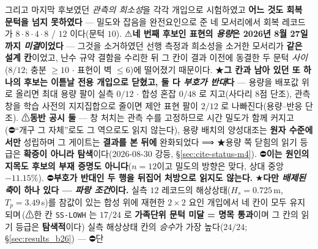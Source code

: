 \documentclass[11pt]{report}
\numberwithin{equation}{chapter}
\numberwithin{figure}{chapter}
\numberwithin{table}{chapter}
\newcommand{\SSLowhNominal}{\,(⚠한 칸 \texttt{SS-LOWH} 는 $17/24$ 로
  \textbf{가족단위 문턱 미달 = 명목 통과}이며 그 칸의 읽기 등급은 \textbf{탐색적}이다)}
\begin{document}
\begin{itemize}
        그리고 마지막 후보였던 \emph{관측의 희소성}을 각각 개입으로 시험하였고
        \textbf{어느 것도 회복 문턱을 넘지 못하였다} --- 밀도와 잡음을 완전요인으로
        준 네 모서리에서 회복 레코드가 $8\cdot8\cdot4\cdot8$ / $12$ 이다(문턱 $10$).
        ⚠\textbf{네 번째 후보인 표현의 \emph{용량}은 2026년 8월 27일까지 \emph{미결}이었다}
        --- 그것을 소거하였던 선행 측정과 희소성을 소거한 모서리가 \textbf{같은 설계 칸}이었고,
        난수 규약 결함을 수리한 뒤 그 칸이 결과 이전에 동결한 두 문턱 \emph{사이}
        ($8/12$; 충분 $\geq 10$ $\cdot$ 표현이 벽 $\leq 6$)에 떨어졌기 때문이다.
        ★\textbf{그 칸과 남아 있던 또 하나의 후보는 이튿날 전용 개입으로 닫혔고, 둘 다
        \emph{부호가 반대}다} --- 용량을 배포값 위로 올리면 최대 용량 팔이 실측 $0/12$
        $\cdot$ 합성 혼잡 $0/48$ 로 지고(사다리 $8$점 단조), 관측 창을 학습 사전의
        지지집합으로 줄이면 제안 표현 팔이 $2/12$ 로 나빠진다(용량--반응 단조).
        ⚠\textbf{동반 공시 둘} --- 창 처치는 관측 수를 고정하므로 시간 밀도가 함께
        커지고(⛔``개구 그 자체''로도 그 역으로도 읽지 않는다), 용량 배치의 양성대조는
        \textbf{원자 수준에서만} 성립하며 그 게이트는 \textbf{결과를 본 뒤에} 완화되었다
        ⟹ ★용량 쪽 닫힘의 읽기 등급은 \textbf{확증이 아니라 탐색}이다(2026-08-30 강등,
        \S\ref{sec:cite-status-m4}).
        ⛔\textbf{이는 원인의 지목도 후보의 부재 증명도 아니다}($n = 12$이고 밀도의
        방향은 맞다, 상대 중앙 $-11.15\%$). ⛔\textbf{부호가 반대인 두 행을 뒤집어
        처방으로 읽지도 않는다.}
        ★\textbf{다만 \emph{배제된 축}이 하나 있다 --- \emph{파랑 조건}이다.}
        실측 $12$ 레코드의 해상상태($H_s = 0.725$\,m, $T_p = 3.49$\,s)를 참값이 있는
        합성 위에 재현한 $2\times2$ 요인 개입에서 네 칸이 모두 유지되며\SSLowhNominal{} 실측 해상상태
        칸의 \emph{승수}가 가장 높다($24/24$; \S\ref{sec:results_b26}) --- ⛔단

\end{itemize}
\end{document}
